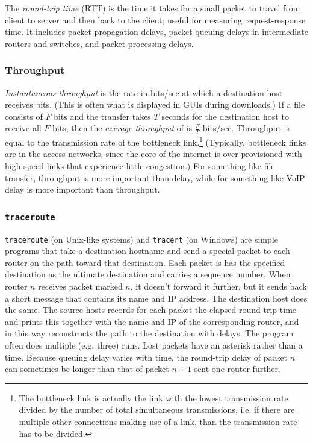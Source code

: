 \documentclass[table, xcdraw]{article}%
\begin{document}
The \emph{round-trip time} (RTT) is the time it takes for a small packet to travel from client to server and then back to the client; useful for measuring request-response time. It includes packet-propagation delays, packet-queuing delays in intermediate routers and switches, and packet-processing delays.

\subsubsection{Throughput} \label{throughput}

\emph{Instantaneous throughput} is the rate in bits/sec at which a destination host receives bits. (This is often what is displayed in GUIs during downloads.) If a file consists of $F$ bits and the transfer takes $T$ seconds for the destination host to receive all $F$ bits, then the \emph{average throughput} of is $\frac{F}{T}$ bits/sec. Throughput is equal to the transmission rate of the bottleneck link.\footnote{The bottleneck link is actually the link with the lowest transmission rate divided by the number of total simultaneous transmissions, i.e. if there are multiple other connections making use of a link, than the transmission rate has to be divided.} (Typically, bottleneck links are in the access networks, since the core of the internet is over-provisioned with high speed links that experience little congestion.) For something like file transfer, throughput is more important than delay, while for something like VoIP delay is more important than throughput.

\subsubsection{\texttt{traceroute}}

\texttt{traceroute} (on Unix-like systems) and \texttt{tracert} (on Windows) are simple programs that take a destination hostname and send a special packet to each router on the path toward that destination. Each packet is has the specified destination as the ultimate destination and carries a sequence number. When router $n$ receives packet marked $n$, it doesn't forward it further, but it sends back a short message that contains its name and IP address. The destination host does the same. The source hosts records for each packet the elapsed round-trip time and prints this together with the name and IP of the corresponding router, and in this way reconstructs the path to the destination with delays. The program often does multiple (e.g. three) runs. Lost packets have an asterisk rather than a time. Because queuing delay varies with time, the round-trip delay of packet $n$ can sometimes be longer than that of packet $n+1$ sent one router further.
\end{document}
